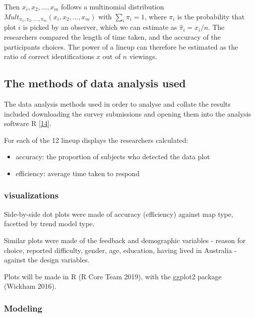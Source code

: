 \documentclass[conference,final,]{IEEEtran}
\providecommand{\tightlist}{%
  \setlength{\itemsep}{0pt}\setlength{\parskip}{0pt}}
\begin{document}
Then \(x_i, x_2, ..., x_m\) follows a multinomial
distribution\(Mult_{\pi_1, \pi_2, ...., \pi_m}(x_i, x_2, ..., x_m)\) with
\(\sum_i \pi_i = 1\), where \(\pi_i\) is the probability that plot \(i\) is picked by an
observer, which we can estimate as \(\hat{\pi}_i = x_i/n\).
The researchers compared the length of time taken, and the accuracy of the participants choices.
The power of a lineup can therefore be estimated as the ratio of correct
identifications \(x\) out of \(n\) viewings.

\hypertarget{the-methods-of-data-analysis-used}{%
\subsection{The methods of data analysis used}\label{the-methods-of-data-analysis-used}}

The data analysis methods used in order to analyse and collate the results included downloading the survey submissions and opening them into the analysis software R {[}\protect\hyperlink{ref-RCore}{14}{]}.

For each of the 12 lineup displays the researchers calculated:

\begin{itemize}
\tightlist
\item
  accuracy: the proportion of subjects who detected the data plot
\item
  efficiency: average time taken to respond
\end{itemize}

\hypertarget{visualizations}{%
\subsubsection{visualizations}\label{visualizations}}

Side-by-side dot plots were made of accuracy (efficiency) against map type, facetted by trend model type.

Similar plots were made of the feedback and demographic variables - reason for choice, reported difficulty, gender, age, education, having lived in Australia - against the design variables.

Plots will be made in R (R Core Team 2019), with the ggplot2 package (Wickham 2016).

\hypertarget{modeling}{%
\subsubsection{Modeling}\label{modeling}}
\end{document}
